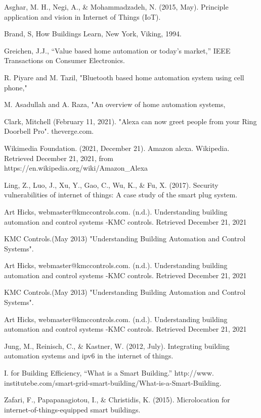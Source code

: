\documentclass[conference]{IEEEtran}
\begin{document}
\begin{thebibliography}{00}
   
 Asghar, M. H., Negi, A., \& Mohammadzadeh, N. (2015, May). Principle application and vision in Internet of Things (IoT). 
 
 Brand, S, How Buildings Learn, New York, Viking, 1994. 
 
 Greichen, J.J., “Value based home automation or today's market,” IEEE Transactions on Consumer Electronics.
 
 R. Piyare and M. Tazil, "Bluetooth based home automation system using cell phone," 

 M. Asadullah and A. Raza, "An overview of home automation systems,

 Clark, Mitchell (February 11, 2021). "Alexa can now greet people from your Ring Doorbell Pro". theverge.com. 

 Wikimedia Foundation. (2021, December 21). Amazon alexa. Wikipedia. Retrieved December 21, 2021, from https://en.wikipedia.org/wiki/Amazon\_Alexa 

Ling, Z., Luo, J., Xu, Y., Gao, C., Wu, K., \& Fu, X. (2017). Security vulnerabilities of internet of things: A case study of the smart plug system.


Art Hicks, webmaster@kmccontrols.com. (n.d.). Understanding building automation and control systems -KMC controls. Retrieved December 21, 2021

KMC Controls.(May 2013) "Understanding Building Automation and Control Systems". 


Art Hicks, webmaster@kmccontrols.com. (n.d.). Understanding building automation and control systems -KMC controls. Retrieved December 21, 2021

KMC Controls.(May 2013) "Understanding Building Automation and Control Systems". 


Art Hicks, webmaster@kmccontrols.com. (n.d.). Understanding building automation and control systems -KMC controls. Retrieved December 21, 2021

 Jung, M., Reinisch, C., \& Kastner, W. (2012, July). Integrating building automation systems and ipv6 in the internet of things. 


I. for Building Efficiency, “What is a Smart Building.” http://www.
institutebe.com/smart-grid-smart-building/What-is-a-Smart-Building.


Zafari, F., Papapanagiotou, I., \& Christidis, K. (2015). Microlocation for internet-of-things-equipped smart buildings. 


\end{thebibliography}
\end{document}
